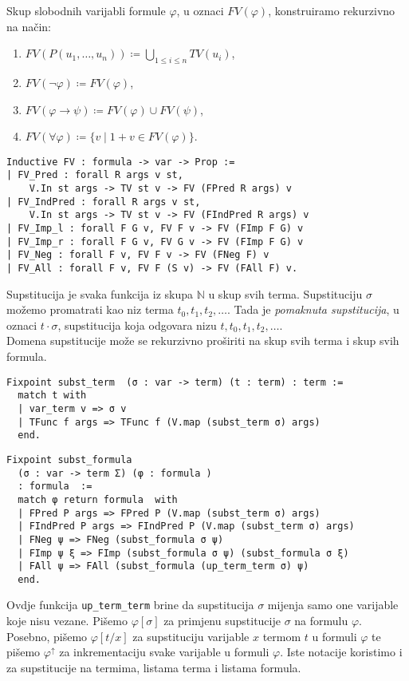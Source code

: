 \begin{definition}
  Skup slobodnih varijabli formule \(\varphi\), u oznaci \(\mathit{FV}(\varphi)\), konstruiramo rekurzivno na način:
  \begin{enumerate}
  \item \( \mathit{FV}(P(u_{1}, \ldots, u_{n})) \coloneq \bigcup_{1 \le i \le n} \mathit{TV}(u_{i}) \),
  \item \( \mathit{FV}(\neg\varphi) \coloneq \mathit{FV}(\varphi)\),
  \item \( \mathit{FV}(\varphi \rightarrow \psi) \coloneq \mathit{FV}(\varphi) \cup \mathit{FV}(\psi) \),
  \item \( \mathit{FV(\forall \varphi)} \coloneq \{ v \mid 1 + v \in \mathit{FV}(\varphi) \} \).
  \end{enumerate}
\begin{verbatim}
Inductive FV : formula -> var -> Prop :=
| FV_Pred : forall R args v st,
    V.In st args -> TV st v -> FV (FPred R args) v
| FV_IndPred : forall R args v st,
    V.In st args -> TV st v -> FV (FIndPred R args) v
| FV_Imp_l : forall F G v, FV F v -> FV (FImp F G) v
| FV_Imp_r : forall F G v, FV G v -> FV (FImp F G) v
| FV_Neg : forall F v, FV F v -> FV (FNeg F) v
| FV_All : forall F v, FV F (S v) -> FV (FAll F) v.
\end{verbatim}
\end{definition}

\begin{definition}[Supstitucija]
  Supstitucija je svaka funkcija iz skupa \(\mathbb{N}\) u skup svih terma.
  Supstituciju \(\sigma\) možemo promatrati kao niz terma \(t_{0}, t_{1}, t_{2}, \ldots\).
  Tada je \textit{pomaknuta supstitucija}, u oznaci \(t \cdot \sigma\), supstitucija koja odgovara nizu \(t, t_{0}, t_{1}, t_{2}, \ldots\).\\
  \noindent Domena supstitucije može se rekurzivno proširiti na skup svih terma i skup svih formula.
\begin{verbatim}
Fixpoint subst_term  (σ : var -> term) (t : term) : term :=
  match t with
  | var_term v => σ v
  | TFunc f args => TFunc f (V.map (subst_term σ) args)
  end.
\end{verbatim}
\begin{verbatim}
Fixpoint subst_formula
  (σ : var -> term Σ) (φ : formula )
  : formula  :=
  match φ return formula  with
  | FPred P args => FPred P (V.map (subst_term σ) args)
  | FIndPred P args => FIndPred P (V.map (subst_term σ) args)
  | FNeg ψ => FNeg (subst_formula σ ψ)
  | FImp ψ ξ => FImp (subst_formula σ ψ) (subst_formula σ ξ)
  | FAll ψ => FAll (subst_formula (up_term_term σ) ψ)
  end.
\end{verbatim}
  \noindent Ovdje funkcija \texttt{up\_term\_term} brine da supstitucija \(\sigma\) mijenja samo one varijable koje nisu vezane.
  \noindent Pišemo \(\varphi[\sigma]\) za primjenu supstitucije \(\sigma\) na formulu \(\varphi\). Posebno,  pišemo \(\varphi[t/x]\) za supstituciju varijable \(x\) termom \(t\) u formuli \(\varphi\) te pišemo \(\varphi^{\uparrow}\) za inkrementaciju svake varijable u formuli \(\varphi\). Iste notacije koristimo i za supstitucije na termima, listama terma i listama formula.
\end{definition}


